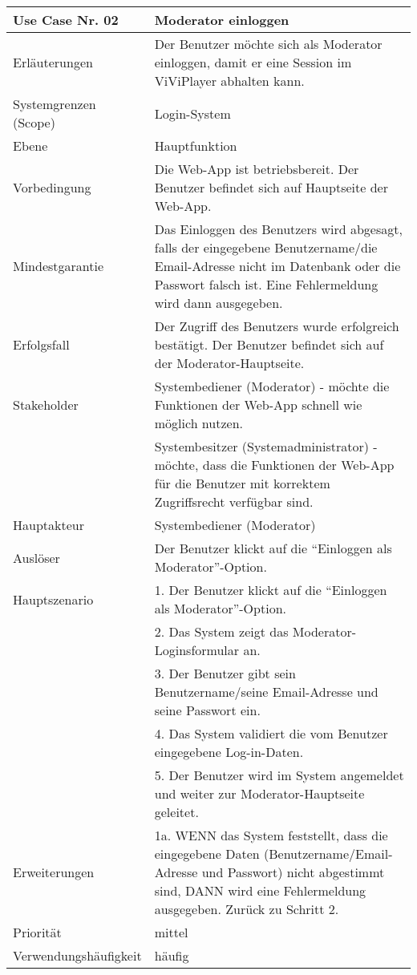 \begin{tabularx}{\linewidth}{|l|X|}
	\hline
	Use Case Nr. 02			& \textbf{Moderator einloggen} \\ \hline
	Erläuterungen			& Der Benutzer möchte sich als Moderator einloggen, damit er eine 
							  Session im ViViPlayer abhalten kann. \\ \hline
	Systemgrenzen (Scope)	& Login-System \\ \hline
	Ebene					& Hauptfunktion \\ \hline
	Vorbedingung			& Die Web-App ist betriebsbereit. Der Benutzer befindet sich auf
							  Hauptseite der Web-App. \\ \hline
	Mindestgarantie			& Das Einloggen des Benutzers wird abgesagt, falls der eingegebene
							  Benutzername/die Email-Adresse nicht im Datenbank oder die Passwort falsch ist. Eine Fehlermeldung wird dann ausgegeben.
							  \\ \hline
	Erfolgsfall 			& Der Zugriff des Benutzers wurde erfolgreich bestätigt. Der
							  Benutzer befindet sich auf der Moderator-Hauptseite. 
							  \\ \hline
	Stakeholder				& Systembediener (Moderator) - möchte die Funktionen der Web-App 
							  schnell wie möglich nutzen. \\
							& Systembesitzer (Systemadministrator) - möchte, dass die Funktionen 
							  der Web-App für die Benutzer mit korrektem Zugriffsrecht verfügbar sind.\\ \hline
	Hauptakteur				& Systembediener (Moderator) \\ \hline
	Auslöser				& Der Benutzer klickt auf die ``Einloggen als Moderator''-Option.\\ 
							  \hline	
	Hauptszenario			& 1. Der Benutzer klickt auf die ``Einloggen als 
							  Moderator''-Option.\\
							& 2. Das System zeigt das Moderator-Loginsformular an. \\
							& 3. Der Benutzer gibt sein Benutzername/seine Email-Adresse und 
							  seine Passwort ein. \\
							& 4. Das System validiert die vom Benutzer eingegebene
							  Log-in-Daten. \\
							& 5. Der Benutzer wird im System angemeldet und weiter zur
							  Moderator-Hauptseite geleitet. \\ \hline
	Erweiterungen			& 1a. WENN das System feststellt, dass die eingegebene Daten 
							  (Benutzername/Email-Adresse und Passwort) nicht abgestimmt sind, DANN wird eine Fehlermeldung ausgegeben. Zurück zu Schritt 2. \\ \hline
	Priorität				& mittel \\ \hline
	Verwendungshäufigkeit	& häufig \\ \hline
\end{tabularx}
